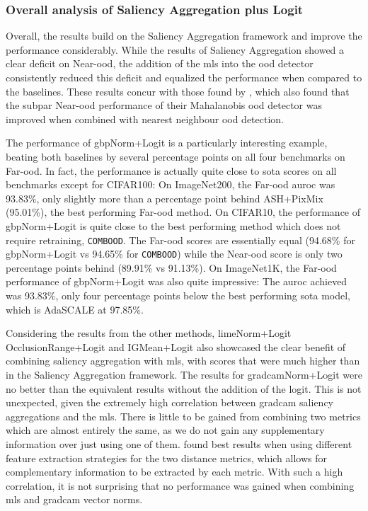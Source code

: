 \documentclass[UKenglish]{uiomasterthesis} %
\theoremstyle{definition}
\begin{document}
\subsubsection{Overall analysis of Saliency Aggregation plus Logit}

Overall, the results build on the Saliency Aggregation framework and improve the performance considerably. While the results of Saliency Aggregation showed a clear deficit on Near-\ac{ood}, the addition of the \ac{mls} into the \ac{ood} detector consistently reduced this deficit and equalized the performance when compared to the baselines. These results concur with those found by \cite{combood}, which also found that the subpar Near-\ac{ood} performance of their Mahalanobis \ac{ood} detector was improved when combined with nearest neighbour \ac{ood} detection.

The performance of \ac{gbp}Norm+Logit is a particularly interesting example, beating both baselines by several percentage points on all four benchmarks on Far-\ac{ood}. In fact, the performance is actually quite close to \ac{sota} scores on all benchmarks except for CIFAR100: On ImageNet200, the Far-\ac{ood} \ac{auroc} was 93.83\%, only slightly more than a percentage point behind ASH+PixMix (95.01\%), the best performing Far-\ac{ood} method. On CIFAR10, the performance of \ac{gbp}Norm+Logit is quite close to the best performing method which does not require retraining, \texttt{COMBOOD}. The Far-\ac{ood} scores are essentially equal (94.68\% for \ac{gbp}Norm+Logit vs 94.65\% for \texttt{COMBOOD}) while the Near-\ac{ood} score is only two percentage points behind (89.91\% vs 91.13\%). On ImageNet1K, the Far-\ac{ood} performance of \ac{gbp}Norm+Logit was also quite impressive: The \ac{auroc} achieved was 93.83\%, only four percentage points below the best performing \ac{sota} model, which is AdaSCALE \cite{adascale} at 97.85\%.

Considering the results from the other methods, \ac{lime}Norm+Logit OcclusionRange+Logit and IGMean+Logit also showcased the clear benefit of combining saliency aggregation with \ac{mls}, with scores that were much higher than in the Saliency Aggregation framework. The results for \ac{gradcam}Norm+Logit were no better than the equivalent results without the addition of the logit. This is not unexpected, given the extremely high correlation between \ac{gradcam} saliency aggregations and the \ac{mls}. There is little to be gained from combining two metrics which are almost entirely the same, as we do not gain any supplementary information over just using one of them. \cite{combood} found best results when using different feature extraction strategies for the two distance metrics, which allows for complementary information to be extracted by each metric. With such a high correlation, it is not surprising that no performance was gained when combining \ac{mls} and \ac{gradcam} vector norms.
\end{document}

